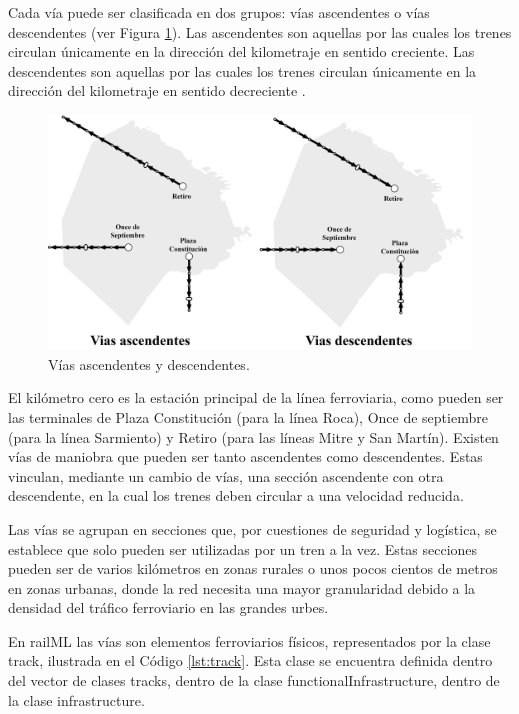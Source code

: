     Cada vía puede ser clasificada en dos grupos: vías ascendentes o vías descendentes (ver Figura \ref{fig:vias_2}). Las ascendentes son aquellas por las cuales los trenes circulan únicamente en la dirección del kilometraje en sentido creciente. Las descendentes son aquellas por las cuales los trenes circulan únicamente en la dirección del kilometraje en sentido decreciente \cite{RITO}. 

    \begin{figure}[H]
        \centering
        \includegraphics[width=1\textwidth]{Figuras/ascDesc.png}
        \centering\caption{Vías ascendentes y descendentes.}
        \label{fig:vias_2}
    \end{figure}

    El kilómetro cero es la estación principal de la línea ferroviaria, como pueden ser las terminales de Plaza Constitución (para la línea Roca), Once de septiembre (para la línea Sarmiento) y Retiro (para las líneas Mitre y San Martín).  Existen vías de maniobra que pueden ser tanto ascendentes como descendentes. Estas vinculan, mediante un cambio de vías, una sección ascendente con otra descendente, en la cual los trenes deben circular a una velocidad reducida. 

    Las vías se agrupan en secciones que, por cuestiones de seguridad y logística, se establece que solo pueden ser utilizadas por un tren a la vez. Estas secciones pueden ser de varios kilómetros en zonas rurales o unos pocos cientos de metros en zonas urbanas, donde la red necesita una mayor granularidad debido a la densidad del tráfico ferroviario en las grandes urbes.

    En railML las vías son elementos ferroviarios físicos, representados por la clase track, ilustrada en el Código \ref{lst:track}. Esta clase se encuentra definida dentro del vector de clases tracks, dentro de la clase functionalInfrastructure, dentro de la clase infrastructure.

